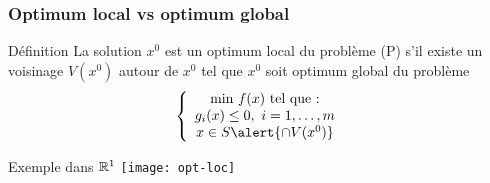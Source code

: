 \documentclass{beamer}
\newcommand{\R}{{\ensuremath\mathbb{R}}}
\begin{document}
\begin{frame}
{  }
\end{frame}

\begin{frame}
  \frametitle{Optimum local vs optimum global}

  \begin{block}{Définition}
    La solution $x^0$ est un optimum local du problème (P) s'il existe un voisinage
    $V(x^0)$ autour de $x^0$ tel que $x^0$ soit optimum global du problème
  \[
  \left\{
  \begin{array}{c}
    \text{min} \ f(x) \ \text{tel que :} \\
    g_i(x) \leq 0, \ i = 1, \dots, m \\
    x \in S \alert{\cap V(x^0)}
  \end{array}
  \right.
  \]
  \end{block}

  \begin{exampleblock}{Exemple dans $\R^1$}
    \centering
    \texttt{[image: opt-loc]}
  \end{exampleblock}
  
\end{frame}




\end{document}
